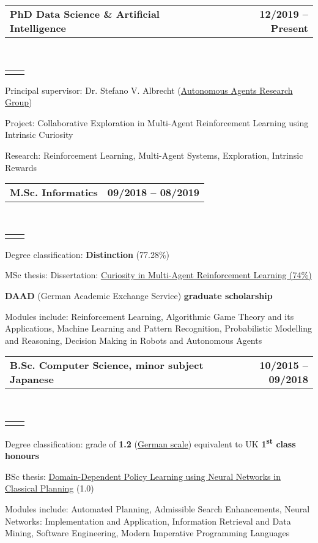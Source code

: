 \documentclass[]{lukas-cv}
\makeatletter
\newcommand{\headerrow}[2]
{\begin{tabular*}{\linewidth}{l@{\extracolsep{\fill}}r}
	\fontspec{Helvetica}\fontsize{12pt}{12pt}\selectfont\bfseries{\color{subheadings}#1} &
	\fontspec{Helvetica}\fontsize{12pt}{12pt}\selectfont\bfseries{\color{subheadings}#2} \\
\end{tabular*}}
\newcommand{\locationrow}[2]
{\begin{tabular*}{\linewidth}{l@{\extracolsep{\fill}}r}
        \color{headings}\scshape\fontspec{Heiti TC Medium}\fontsize{10pt}{12pt}\selectfont{#1}  &
        \color{headings}\scshape\fontspec{Heiti TC Medium}\fontsize{10pt}{12pt}\selectfont{#2}  \\
\end{tabular*}}
\makeatother
\begin{document}
\noindent
\headerrow{PhD Data Science \& Artificial Intelligence}{12/2019 -- Present}
\\
\locationrow{University of Edinburgh}{Edinburgh, United Kingdom}
\begin{tightitemize}{1.7em}
    \item Principal supervisor: Dr. Stefano V. Albrecht (\href{https://agents.inf.ed.ac.uk}{Autonomous Agents Research Group})
    \item Project: Collaborative Exploration in Multi-Agent Reinforcement Learning using Intrinsic Curiosity
    \item Research: Reinforcement Learning, Multi-Agent Systems, Exploration, Intrinsic Rewards
\end{tightitemize}
\largesectionsep

\noindent
\headerrow{M.Sc. Informatics}{09/2018 -- 08/2019}
\\
\locationrow{University of Edinburgh}{Edinburgh, United Kingdom}
\begin{tightitemize}{1.7em}
    \item Degree classification: \textbf{Distinction} (77.28\%)
    \item MSc thesis: Dissertation: \href{https://www.lukaschaefer.de/assets/files/msc_thesis.pdf}{Curiosity in Multi-Agent Reinforcement Learning (74\%)}
    \item \textbf{DAAD} (German Academic Exchange Service) \textbf{graduate scholarship}
    \item Modules include: Reinforcement Learning, Algorithmic Game Theory and its Applications, Machine Learning and 
    Pattern Recognition, Probabilistic Modelling and Reasoning, Decision Making in Robots and Autonomous Agents
\end{tightitemize}
\largesectionsep

\noindent
\headerrow{B.Sc. Computer Science, minor subject Japanese}{10/2015 -- 09/2018}
\\
\locationrow{Saarland University}{Saarbrücken, Germany}
\begin{tightitemize}{1.7em}
    \item Degree classification: grade of \textbf{1.2} (\href{https://en.wikipedia.org/wiki/Academic_grading_in_Germany}{German scale}) equivalent to UK \textbf{1\textsuperscript{st} class honours}
    \item BSc thesis: \href{https://www.lukaschaefer.de/assets/files/bsc_thesis.pdf}{Domain-Dependent Policy Learning using Neural Networks in Classical Planning} (1.0)
    \item Modules include: Automated Planning, Admissible Search Enhancements, Neural Networks: Implementation and Application, Information Retrieval and Data Mining, Software Engineering, Modern Imperative Programming Languages
\end{tightitemize}
\largesectionsep
\end{document}

